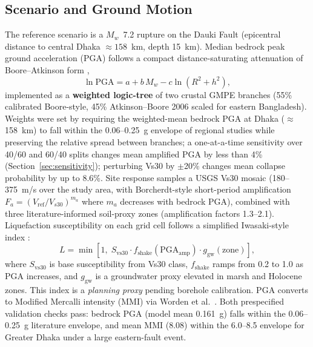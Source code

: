 \documentclass[a4paper,fleqn]{cas-sc}
\begin{document}
\subsection{Scenario and Ground Motion}
\label{sec:hazard}
The reference scenario is a $M_w$~7.2 rupture on the Dauki Fault
(epicentral distance to central Dhaka $\approx 158$~km, depth 15~km).
Median bedrock peak ground acceleration (PGA) follows a compact
distance-saturating attenuation of Boore--Atkinson form \cite{boore2008},
\begin{equation}
\ln \mathrm{PGA} = a + b\,M_w - c \ln\!\left(R^2 + h^2\right),
\end{equation}
implemented as a \textbf{weighted logic-tree} of two crustal GMPE branches
(55\% calibrated Boore-style, 45\% Atkinson--Boore 2006 scaled for eastern
Bangladesh). Weights were set by requiring the weighted-mean bedrock PGA at
Dhaka ($\approx$158~km) to fall within the 0.06--0.25~g envelope of regional
studies \cite{cdmp2009} while preserving the relative spread between branches;
a one-at-a-time sensitivity over 40/60 and 60/40 splits changes mean
amplified PGA by less than 4\% (Section~\ref{sec:sensitivity}); perturbing
Vs30 by $\pm$20\% changes mean collapse probability by up to 8.6\%.
Site response samples
a USGS Vs30 mosaic \cite{borcherdt1994} (180--375~m/s over the study area,
with Borcherdt-style short-period amplification $F_a = (V_{\mathrm{ref}}/V_{s30})^{m_a}$ where $m_a$ decreases with bedrock PGA), combined with three
literature-informed soil-proxy zones (amplification factors 1.3--2.1).
Liquefaction susceptibility on each grid cell follows a simplified
Iwasaki-style index \cite{iwasaki1982,kramer1996}:
\begin{equation}
L = \min\!\left[1,\; S_{\mathrm{vs30}} \cdot f_{\mathrm{shake}}(\mathrm{PGA_{amp}}) \cdot g_{\mathrm{gw}}(\mathrm{zone}) \right],
\end{equation}
where $S_{\mathrm{vs30}}$ is base susceptibility from Vs30 class,
$f_{\mathrm{shake}}$ ramps from 0.2 to 1.0 as PGA increases, and
$g_{\mathrm{gw}}$ is a groundwater proxy elevated in marsh and Holocene
zones. This index is a \textit{planning proxy} pending borehole calibration.
PGA converts to Modified Mercalli intensity (MMI) via Worden et al.\
\cite{worden2012}. Both prespecified validation checks pass: bedrock PGA
(model mean 0.161~g) falls within the 0.06--0.25~g literature envelope, and
mean MMI (8.08) within the 6.0--8.5 envelope for Greater Dhaka under a large
eastern-fault event.
\end{document}

